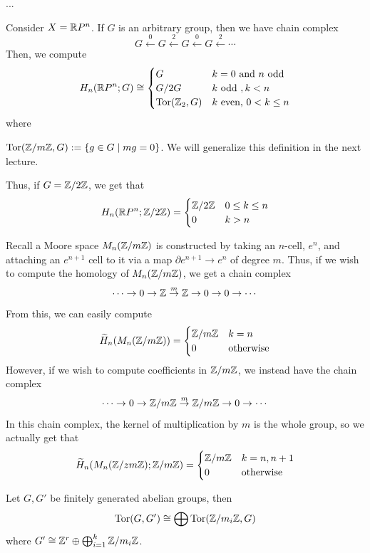 \documentclass[11pt,leqno,oneside]{amsart}
\numberwithin{thm}{section}
\newcommand{\homl}[1][n]{H_{#1}}
\newcommand{\rhoml}[1][n]{\widetilde{H}_{#1}}
\begin{document}
...
\begin{example}
  Consider \(X = {\mathbb R} P^n\). If \(G\) is an arbitrary group, then we
  have chain complex \[
    G \overset{0}{\leftarrow} G \overset{2}{\leftarrow} G \overset{0}{\leftarrow} G \overset{2}{\leftarrow} \cdots
  \]
  Then, we compute \[
    \homl(\R P^n;G) \isom
    \begin{cases}
      G & k=0 \text{ and } n \text{ odd}\\
      G/2G & k \text{ odd }, k < n\\
      \Tor(\Z_2,G) & k \text{ even, } 0 < k \leq n
    \end{cases}
  \]
  where
  \begin{defn}
    \(\operatorname{Tor}({\mathbb Z}/m{\mathbb Z},G) := \{g \in G \mid mg = 0\}\). We will generalize
    this definition in the next lecture.
  \end{defn}
  Thus, if \(G = {\mathbb Z}/2{\mathbb Z}\), we get that \[
    \homl(\R P^n; \Z/2\Z) =
    \begin{cases}
      \Z/2\Z & 0 \leq k \leq n \\
      0 & k > n
    \end{cases}
  \]
\end{example}
\begin{example}
  Recall a Moore space \(M_n({\mathbb Z}/m{\mathbb Z})\) is constructed by taking an
  \(n\)-cell, \(e^n\), and attaching an \(e^{n+1}\) cell to it via a
  map \(\partial e^{n+1} \to e^n\) of degree \(m\). Thus, if we wish
  to compute the homology of \(M_n({\mathbb Z}/m{\mathbb Z})\), we get a chain
  complex \[
    \cdots \to 0 \to {\mathbb Z} \overset{m}{\to} {\mathbb Z} \to 0 \to 0 \to \cdots
  \]
  From this, we can easily compute \[
    \rhoml(M_n(\Z/m\Z)) =
    \begin{cases}
      \Z/m\Z & k=n \\
      0 & \text{otherwise}
    \end{cases}
  \]
  However, if we wish to compute coefficients in \({\mathbb Z}/m{\mathbb Z}\), we
  instead have the chain complex \[
    \cdots \to 0 \to {\mathbb Z}/m{\mathbb Z} \overset{m}{\to} {\mathbb Z}/m{\mathbb Z} \to 0 \to \cdots
  \]
  In this chain complex, the kernel of multiplication by \(m\) is
  the whole group, so we actually get that \[
    \rhoml(M_n(\Z/zm\Z); \Z/m\Z) =
    \begin{cases}
      \Z/m\Z & k = n,n+1 \\
      0 & \text{otherwise}
    \end{cases}
  \]
\end{example}
\begin{defn}
  Let \(G,G'\) be finitely generated abelian groups, then \[
    \operatorname{Tor}(G,G') \mathrel{\cong} \bigoplus \operatorname{Tor}({\mathbb Z}/m_i {\mathbb Z}, G)
  \]
  where \(G' \mathrel{\cong} {\mathbb Z}^r \oplus \bigoplus_{i=1}^k {\mathbb Z}/m_i{\mathbb Z}\).
\end{defn}
\end{document}
